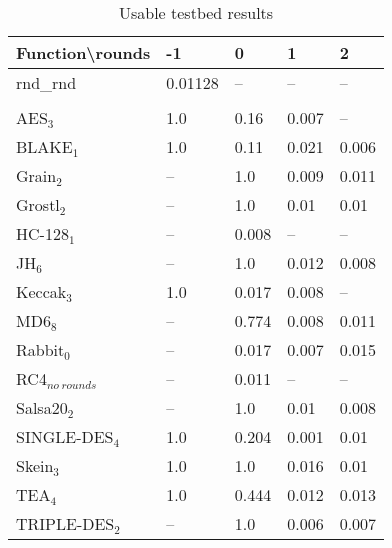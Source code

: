 \documentclass[twoside,a4paper]{article}
\begin{document}
\newcommand{\fd}{\cellcolor{red!13}}
\newcommand{\fn}{\cellcolor{green!13}}

\begin{table}[H]
\centering
\label{res_usable}
\begin{tabular}{l|l l l l}
Function\textbackslash{}rounds & -1 & 0 & 1 & 2\\ \hline
rnd\_rnd         & \fn{}0.01128 & --       & --         & --        \\\\
AES$_{3}$        & \fd{}1.0   & \fd{}0.16  & \fn{}0.007 & \fn{}--   \\
BLAKE$_{1}$      & \fd{}1.0   & \fd{}0.11  & \fn{}0.021 & \fn{}0.006\\
Grain$_{2}$      & \fd{}--    & \fd{}1.0   & \fn{}0.009 & \fn{}0.011\\
Grostl$_{2}$     & \fd{}--    & \fd{}1.0   & \fn{}0.01  & \fn{}0.01 \\
HC-128$_{1}$     & \fd{}--    & \fn{}0.008 & \fn{}--    & \fn{}--   \\
JH$_{6}$         & \fd{}--    & \fd{}1.0   & \fn{}0.012 & \fn{}0.008\\
Keccak$_{3}$     & \fd{}1.0   & \fn{}0.017 & \fn{}0.008 & \fn{}--   \\
MD6$_{8}$        & \fd{}--    & \fd{}0.774 & \fn{}0.008 & \fn{}0.011\\
Rabbit$_{0}$     & \fd{}--    & \fn{}0.017 & \fn{}0.007 & \fn{}0.015\\
RC4$_{no~rounds}$& --         & \fn{}0.011 & --         & --        \\
Salsa20$_{2}$    & \fd{}--    & \fd{}1.0   & \fn{}0.01  & \fn{}0.008\\
SINGLE-DES$_{4}$ & \fd{}1.0   & \fd{}0.204 & \fn{}0.001 & \fn{}0.01 \\
Skein$_{3}$      & \fd{}1.0   & \fd{}1.0   & \fn{}0.016 & \fn{}0.01 \\
TEA$_{4}$        & \fd{}1.0   & \fd{}0.444 & \fn{}0.012 & \fn{}0.013\\
TRIPLE-DES$_{2}$ & \fd{}--    & \fd{}1.0   & \fn{}0.006 & \fn{}0.007
\end{tabular}
\caption{Usable testbed results}
\end{table}
\end{document}

